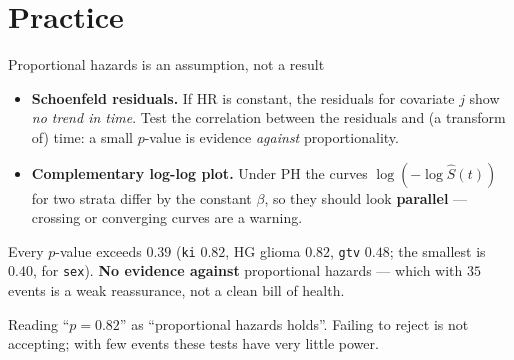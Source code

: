 \documentclass[aspectratio=169,11pt]{beamer}
\begin{document}
\section{Practice}

\begin{frame}{Proportional hazards is an assumption, not a result}
  \footnotesize
  \begin{readme}
    \begin{itemize}
      \item \textbf{Schoenfeld residuals.} If $\mathrm{HR}$ is constant, the residuals for
            covariate $j$ show \emph{no trend in time}. Test the correlation between the
            residuals and (a transform of) time: a small $p$-value is evidence
            \emph{against} proportionality.
      \item \textbf{Complementary log-log plot.} Under PH the curves
            $\log(-\log\hat S(t))$ for two strata differ by the constant $\beta$, so they
            should look \textbf{parallel} --- crossing or converging curves are a warning.
    \end{itemize}
  \end{readme}
  \begin{numexample}
    Every $p$-value exceeds $0.39$ (\texttt{ki} $0.82$, HG glioma $0.82$, \texttt{gtv} $0.48$;
    the smallest is $0.40$, for \texttt{sex}). \textbf{No evidence against} proportional hazards --- which
    with $35$ events is a weak reassurance, not a clean bill of health.
  \end{numexample}
  \begin{mistake}
  \scriptsize
    Reading ``$p=0.82$'' as ``proportional hazards holds''. Failing to reject is not
    accepting; with few events these tests have very little power.
  \end{mistake}
\end{frame}
\end{document}
